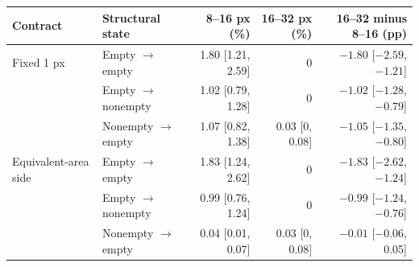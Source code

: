 \begin{tabular}{@{}llrrr@{}}
\toprule
Contract & Structural state & 8--16 px (\%) & 16--32 px (\%) & 16--32 minus 8--16 (pp) \\
\midrule
Fixed 1 px & Empty $\rightarrow$ empty & 1.80 [1.21, 2.59] & 0 & $-1.80$ [$-2.59$, $-1.21$] \\
 & Empty $\rightarrow$ nonempty & 1.02 [0.79, 1.28] & 0 & $-1.02$ [$-1.28$, $-0.79$] \\
 & Nonempty $\rightarrow$ empty & 1.07 [0.82, 1.38] & 0.03 [0, 0.08] & $-1.05$ [$-1.35$, $-0.80$] \\
\addlinespace
Equivalent-area side & Empty $\rightarrow$ empty & 1.83 [1.24, 2.62] & 0 & $-1.83$ [$-2.62$, $-1.24$] \\
 & Empty $\rightarrow$ nonempty & 0.99 [0.76, 1.24] & 0 & $-0.99$ [$-1.24$, $-0.76$] \\
 & Nonempty $\rightarrow$ empty & 0.04 [0.01, 0.07] & 0.03 [0, 0.08] & $-0.01$ [$-0.06$, 0.05] \\
\bottomrule
\end{tabular}
